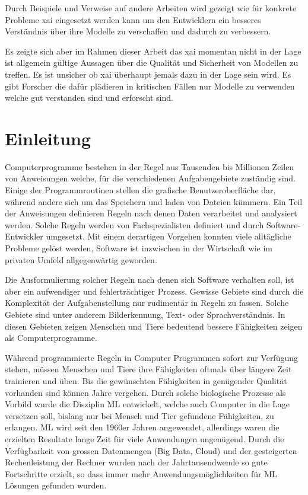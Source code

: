 \documentclass[
  12pt, %
  a4paper, %
  oneside, %
  openany, 
  numbers=noenddot, %
  BCOR=5mm, %
  parskip=half*, %
  thesis, %
]{bfhbook}
\begin{document}
Durch Beispiele und Verweise auf andere Arbeiten wird gezeigt wie für konkrete Probleme \Gls{xai} eingesetzt werden kann um den Entwicklern ein besseres Verständnis über ihre Modelle  zu verschaffen und dadurch zu verbessern.

Es zeigte sich aber im Rahmen dieser Arbeit das \Gls{xai} momentan nicht in der Lage ist allgemein gültige Aussagen über die Qualität und Sicherheit von  Modellen zu treffen. Es ist unsicher ob \Gls{xai} überhaupt jemals dazu in der Lage sein wird. Es gibt Forscher die dafür plädieren in kritischen Fällen nur Modelle zu verwenden welche gut verstanden sind und erforscht sind.

\chapter{Einleitung}
Computerprogramme bestehen in der Regel aus Tausenden bis Millionen Zeilen von Anweisungen welche, für die verschiedenen Aufgabengebiete zuständig sind. Einige der Programmroutinen stellen die grafische Benutzeroberfläche dar, während andere sich um das Speichern und laden von Dateien kümmern. Ein Teil der Anweisungen definieren Regeln nach denen Daten verarbeitet und analysiert werden. Solche Regeln werden von Fachspezialisten definiert und durch Software-Entwickler umgesetzt. Mit einem derartigen Vorgehen konnten viele alltägliche Probleme gelöst werden, Software ist inzwischen in der Wirtschaft wie im privaten Umfeld allgegenwärtig geworden. 

Die Ausformulierung solcher Regeln nach denen sich Software verhalten soll, ist aber ein aufwendiger und fehlerträchtiger Prozess. Gewisse Gebiete sind durch die Komplexität der Aufgabenstellung nur rudimentär in Regeln zu fassen. Solche Gebiete sind unter anderem Bilderkennung, Text- oder Sprachverständnis. In diesen Gebieten zeigen Menschen und Tiere bedeutend bessere Fähigkeiten zeigen als Computerprogramme. 

Während programmierte Regeln in Computer Programmen sofort zur Verfügung stehen, müssen Menschen und Tiere ihre Fähigkeiten oftmals über längere Zeit trainieren und üben. Bis die gewünschten Fähigkeiten in genügender Qualität vorhanden sind können Jahre vergehen. Durch solche biologische Prozesse als Vorbild wurde die Disziplin \gls{ML} entwickelt, welche auch Computer in die Lage versetzen soll, bislang nur bei Mensch und Tier gefundene Fähigkeiten, zu erlangen.
\gls{ML} wird seit den 1960er Jahren angewendet, allerdings waren die erzielten Resultate lange Zeit für viele Anwendungen ungenügend. Durch die Verfügbarkeit von grossen Datenmengen (Big Data, Cloud) und der gesteigerten Rechenleistung der Rechner wurden nach der Jahrtausendwende so gute Fortschritte erzielt, so dass immer mehr Anwendungsmöglichkeiten für \gls{ML} Lösungen gefunden wurden. 
\end{document}
